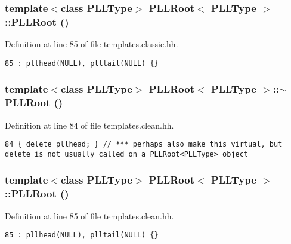 \subsubsection{\setlength{\rightskip}{0pt plus 5cm}template$<$class PLLType$>$ PLLRoot$<$ {\bf PLLType} $>$::PLLRoot ()\hspace{0.3cm}{\tt  [inline]}}\label{classPLLRoot_a1}




Definition at line 85 of file templates.classic.hh.



\footnotesize\begin{verbatim}85 : pllhead(NULL), plltail(NULL) {} 
\end{verbatim}\normalsize 
{}
\subsubsection{\setlength{\rightskip}{0pt plus 5cm}template$<$class PLLType$>$ PLLRoot$<$ {\bf PLLType} $>$::$\sim$PLLRoot ()\hspace{0.3cm}{\tt  [inline]}}\label{classPLLRoot_a17}




Definition at line 84 of file templates.clean.hh.



\footnotesize\begin{verbatim}84 { delete pllhead; } // *** perhaps also make this virtual, but delete is not usually called on a PLLRoot<PLLType> object
\end{verbatim}\normalsize 
{}
\subsubsection{\setlength{\rightskip}{0pt plus 5cm}template$<$class PLLType$>$ PLLRoot$<$ {\bf PLLType} $>$::PLLRoot ()\hspace{0.3cm}{\tt  [inline]}}\label{classPLLRoot_a18}




Definition at line 85 of file templates.clean.hh.



\footnotesize\begin{verbatim}85 : pllhead(NULL), plltail(NULL) {} 
\end{verbatim}\normalsize 
{}
